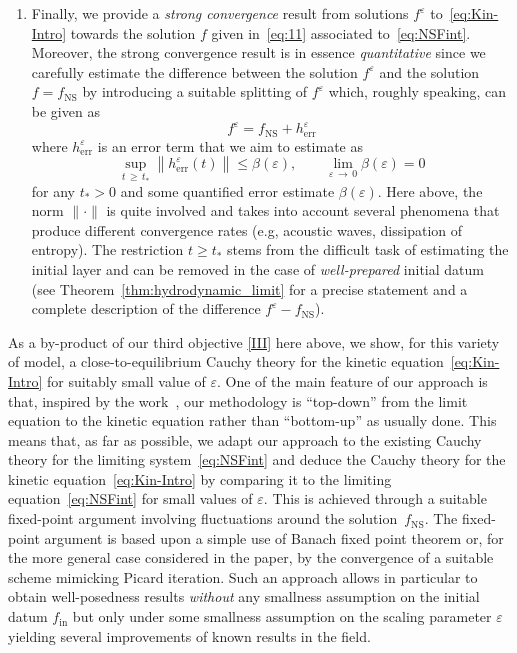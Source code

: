 \documentclass[AHL,Unicode,longabstracts,published]{cedram}
\newcommand{\ini}{\mathrm{in}}
\newcommand{\err}{\mathrm{err}}
\newcommand{\ns}{\mathrm{NS}}
\renewcommand*\ge{\geqslant}
\renewcommand*\leq{\leqslant}
\renewcommand*\geq{\geqslant}
\newcommand*\eps{{\varepsilon}}
\begin{document}
\begin{enumerate}
\item\label{III} Finally, we provide a \emph{strong convergence} result from solutions $f^\eps$ to~\eqref{eq:Kin-Intro} towards the solution $f$ given in~\eqref{eq:11} associated to~\eqref{eq:NSFint}. Moreover, the strong convergence result is in essence \emph{quantitative} since we carefully estimate the difference between the solution $f^{\eps}$ and the solution $f=f_{\ns}$ by introducing a suitable splitting of $f^{\eps}$ which, roughly speaking, can be given as
\[
f^{\eps}=f_{\ns} + h^{\eps}_{\err}
\]
where $h_{\err}^{\eps}$ is an error term that we aim to estimate as
\[
\sup_{t\,\ge\,t_{*}}\left\|h_{\err}^{\eps}(t)\right\| \leq \beta(\eps), \qquad \lim_{\eps\,\to\,0}\beta(\eps)=0
\]
for any $t_{*} >0$ and some quantified error estimate $\beta(\eps)$. Here above, the norm $\|\cdot\|$ is quite involved and takes into account several phenomena that produce different convergence rates (e.g, acoustic waves, dissipation of entropy). The restriction $t \geq t_{*}$ stems from the difficult task of estimating the initial layer and can be removed in the case of \emph{well-prepared} initial datum (see Theorem~\ref{thm:hydrodynamic_limit} for a precise statement and a complete description of the difference $f^{\eps}-f_{\ns}$).
\end{enumerate}

As a by-product of our third objective \eqref{III} here above, we show, for this variety of model, a close-to-equilibrium Cauchy theory for the kinetic equation~\eqref{eq:Kin-Intro} for suitably small value of $\eps$. One of the main feature of our approach is that, inspired by the work~\cite{GT2020}, our methodology is ``top-down'' from the limit equation to the kinetic equation rather than ``bottom-up'' as usually done. This means that, as far as possible, we adapt our approach to the existing Cauchy theory for the limiting system~\eqref{eq:NSFint} and deduce the Cauchy theory for the kinetic equation~\eqref{eq:Kin-Intro} by comparing it to the limiting equation~\eqref{eq:NSFint} for small values of $\eps.$ This is achieved through a suitable fixed-point argument involving fluctuations around the solution~$f_{\ns}$. The fixed-point argument is based upon a simple use of Banach fixed point theorem or, for the more general case considered in the paper, by the convergence of a suitable scheme mimicking Picard iteration. Such an approach allows in particular to obtain well-posedness results \emph{without} any smallness assumption on the initial datum $f_{\ini}$ but only under some smallness assumption on the scaling parameter $\eps$ yielding several improvements of known results in the field.
\end{document}
